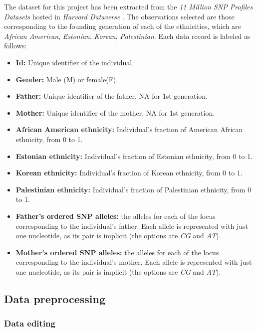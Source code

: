 \documentclass[a4paper, 11pt]{article}
\theoremstyle{definition}
\theoremstyle{remark}
\begin{document}
The dataset for this project has been extracted from the \textit{11 Million SNP Profiles Datasets} hosted in \textit{Harvard Dataverse} \cite{HarvardDataset}. The observations selected are those corresponding to the founding generation of each of the ethnicities, which are \textit{African American}, \textit{Estonian}, \textit{Korean}, \textit{Palestinian}.
Each data record is labeled as follows:
\begin{itemize}
    \item \textbf{Id:} Unique identifier of the individual.
    \item \textbf{Gender:} Male (M) or female(F).
    \item \textbf{Father:} Unique identifier of the father. NA for 1st generation.
    \item \textbf{Mother:} Unique identifier of the mother. NA for 1st generation.
    \item \textbf{African American ethnicity:} Individual's fraction of American African ethnicity, from 0 to 1.
    \item \textbf{Estonian ethnicity:} Individual's fraction of Estonian ethnicity, from 0 to 1.
    \item \textbf{Korean ethnicity:} Individual's fraction of Korean ethnicity, from 0 to 1.
    \item \textbf{Palestinian ethnicity:} Individual's fraction of Palestinian ethnicity, from 0 to 1.
    \item \textbf{Father's ordered SNP alleles:} the alleles for each of the locus corresponding to the individual's father. Each allele is represented with just one nucleotide, as its pair is implicit (the options are \textit{CG} and \textit{AT}).
    \item \textbf{Mother's ordered SNP alleles:} the alleles for each of the locus corresponding to the individual's mother. Each allele is represented with just one nucleotide, as its pair is implicit (the options are \textit{CG} and \textit{AT}).
\end{itemize}


\subsection{Data preprocessing}

\subsubsection*{Data editing}
\end{document}
